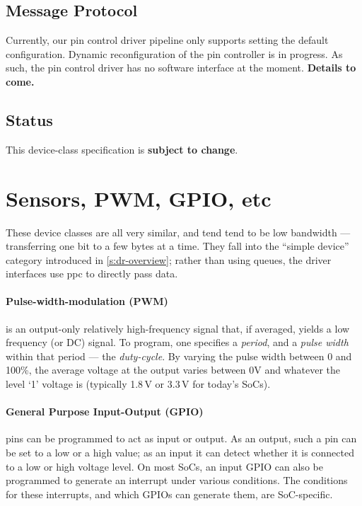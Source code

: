 \documentclass[a4paper,12pt]{report}
\newcommand{\ToCome}[1]{\textbf{#1 to come.}}
\begin{document}
\subsection{Message Protocol}

Currently, our pin control driver pipeline only supports setting the
default configuration. Dynamic reconfiguration of the pin controller
is in progress.  As such, the pin control driver has no software
interface at the moment.  \ToCome{Details}

\subsection{Status}

This device-class specification is \textbf{subject to change}.

\section{Sensors, PWM, GPIO, etc}\label{s:sensors}

These device classes are all very similar, and tend tend to be low
bandwidth --- transferring one bit to a few bytes at a time.  They
fall into the ``simple device'' category introduced in
\autoref{s:dr-overview}; rather than
using queues, the driver interfaces use \gls{ppc} to directly pass data.

\paragraph{Pulse-width-modulation (PWM)} is an output-only relatively
high-frequency signal that, if averaged, yields a low frequency (or
DC) signal.  To program, one specifies a \emph{period}, and a \emph{pulse width}
within that period --- the \emph{duty-cycle}.  By varying the
pulse width between 0 and 100\%, the average voltage at the output
varies between 0V and whatever the level `1' voltage is (typically
1.8\,V or 3.3\,V for today's SoCs).

\paragraph{General Purpose Input-Output (GPIO)} pins can be
programmed to act as input or output.  As an output, such a pin can be
set to a low or a high value; as an input it can detect whether it is
connected to a low or high voltage level.  On most SoCs, an input GPIO
can also be programmed to generate an interrupt under various
conditions. The conditions for these interrupts, and which
GPIOs can generate them, are SoC-specific.
\end{document}
